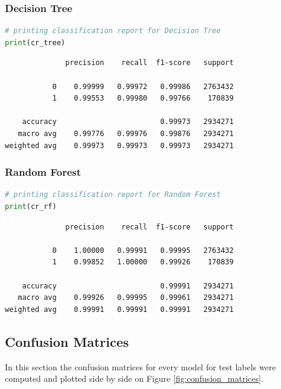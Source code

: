 \documentclass{article}
\begin{document}
\subsubsection{Decision Tree}
\begin{lstlisting}[language=Python]
# printing classification report for Decision Tree
print(cr_tree)
\end{lstlisting}
\begin{verbatim}
              precision    recall  f1-score   support

           0    0.99999   0.99972   0.99986   2763432
           1    0.99553   0.99980   0.99766    170839

    accuracy                        0.99973   2934271
   macro avg    0.99776   0.99976   0.99876   2934271
weighted avg    0.99973   0.99973   0.99973   2934271
\end{verbatim}

\subsubsection{Random Forest}
\begin{lstlisting}[language=Python]
# printing classification report for Random Forest
print(cr_rf)
\end{lstlisting}
\begin{verbatim}   
              precision    recall  f1-score   support

           0    1.00000   0.99991   0.99995   2763432
           1    0.99852   1.00000   0.99926    170839

    accuracy                        0.99991   2934271
   macro avg    0.99926   0.99995   0.99961   2934271
weighted avg    0.99991   0.99991   0.99991   2934271

\end{verbatim}


\subsection{Confusion Matrices}
In this section the confusion matrices for every model for test labels were computed and plotted side by side on Figure \ref{fig:confusion_matrices}.
\end{document}
